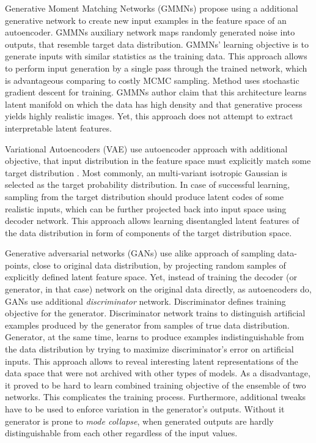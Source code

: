 Generative Moment Matching Networks (GMMNs) \cite{Li2015, Ren2016} propose using a additional generative network to create new input examples in the feature space of an autoencoder.
GMMNs auxiliary network maps randomly generated noise into outputs, that resemble target data distribution.
GMMNs' learning objective is to generate inputs with similar statistics as the training data.
This approach allows to perform input generation by a single pass through the trained network, which is advantageous comparing to costly MCMC sampling.
Method uses stochastic gradient descent for training.
GMMNs author claim that this architecture learns latent manifold on which the data has high density and that generative process yields highly realistic images.
Yet, this approach does not attempt to extract interpretable latent features.

Variational Autoencoders (VAE) use autoencoder approach with additional objective, that input distribution in the feature space must explicitly match some target distribution \cite{Kingma2013, Doersch2016}.
Most commonly, an multi-variant isotropic Gaussian is selected as the target probability distribution.
In case of successful learning, sampling from the target distribution should produce latent codes of some realistic inputs, which can be further projected back into input space using decoder network.
This approach allows learning disentangled latent features of the data distribution in form of components of the target distribution space.

Generative adversarial networks (GANs) \cite{Goodfellow2014} use alike approach of sampling data-points, close to original data distribution, by projecting random samples of explicitly defined latent feature space.
Yet, instead of training the decoder (or generator, in that case) network on the original data directly, as autoencoders do, GANs use additional \textit{discriminator} network.
Discriminator defines training objective for the generator.
Discriminator network trains to distinguish artificial examples produced by the generator from samples of true data distribution.
Generator, at the same time, learns to produce examples indistinguishable from the data distribution by trying to maximize discriminator's error on artificial inputs.
This approach allows to reveal interesting latent representations of the data space that were not archived with other types of models.
As a disadvantage, it proved to be hard to learn combined training objective of the ensemble of two networks.
This complicates the training process.
Furthermore, additional tweaks have to be used to enforce variation in the generator's outputs.
Without it generator is prone to \textit{mode collapse}, when generated outputs are hardly distinguishable from each other regardless of the input values.

